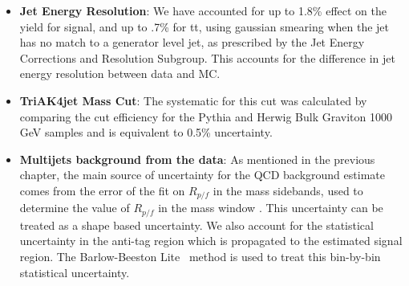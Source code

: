 \begin{itemize}
\item \textbf{Jet Energy Resolution}: We have accounted for up to 1.8\% effect on the yield for signal, and up to .7\% for tt, using gaussian smearing when the jet has no match to a generator level jet, as prescribed by the Jet Energy Corrections and Resolution Subgroup. This accounts for the difference in jet energy resolution between data and MC. 

\item \textbf{TriAK4jet Mass Cut}: The systematic for this cut was calculated by comparing the cut efficiency for the Pythia and Herwig Bulk Graviton 1000 GeV samples and is equivalent to 0.5\% uncertainty. 

\item \textbf{Multijets background from the data}: %
As mentioned in the previous chapter, the main source of uncertainty for the QCD background estimate comes from the error of the fit on $R_{p/f}$ in the mass sidebands, used to determine the value of $R_{p/f}$ in the mass window . This uncertainty can be treated as a shape based uncertainty. We also account for the statistical uncertainty in the anti-tag region which is propagated to the estimated signal region.
The Barlow-Beeston Lite~\cite{BBLite} method is used to treat this bin-by-bin statistical uncertainty. 




\end{itemize}
